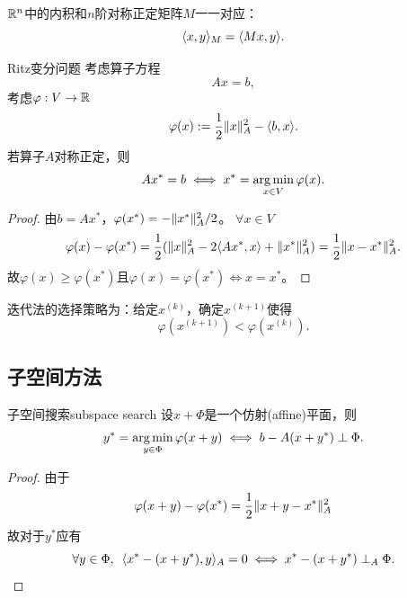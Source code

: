 \begin{corollary}
    $\mathbb{R}^n$中的内积和$n$阶对称正定矩阵$M$一一对应：
    \begin{equation}\label{eq:na-spd-inner-product}
        \langle x,y\rangle_M = \langle Mx,y\rangle.
    \end{equation}
\end{corollary}

\begin{theorem}
    {Ritz变分问题}{}
    考虑算子方程
    \[
        Ax = b,
    \]
    考虑$\varphi:V \to \mathbb{R}$
    \begin{equation}
        \varphi(x) := \frac12\lVert x\rVert_A^2 - \langle b,x\rangle.
    \end{equation}
    若算子$A$对称正定，则
    \begin{equation}
        Ax^* = b \iff x^* = \operatorname*{arg\,min}_{x\in V}\varphi(x).
    \end{equation}
\end{theorem}

\begin{proof}
    由$b = Ax^*$，$\varphi(x^*) = -\lVert x^*\rVert_A^2/2$。
    $\forall x \in V$
    \[
        \varphi(x) - \varphi(x^*) = \frac12(\lVert x\rVert_A^2 - 2\langle Ax^*,x\rangle + \lVert x^*\rVert_A^2) = \frac12\lVert x - x^*\rVert^2_A.
    \]
    故$\varphi(x) \geq \varphi(x^*)$且$\varphi(x) = \varphi(x^*) \iff x = x^*$。
\end{proof}

\begin{corollary}
    迭代法的选择策略为：给定$x^{(k)}$，确定$x^{(k+1)}$使得
    \[
        \varphi(x^{(k+1)}) < \varphi(x^{(k)}).
    \]
\end{corollary}

\subsection{子空间方法}
\label{ssec:subspace method}

\begin{theorem}
    {子空间搜索}{subspace search}
    设$x + \Phi$是一个仿射(affine)平面，则
    \begin{equation}\label{eq:na-subspace-minimization}
        y^* = \operatorname*{arg\,min}_{y\in\Phi}\varphi(x + y) \iff
        b - A(x + y^*) \perp \Phi.
    \end{equation}
\end{theorem}

\begin{proof}
    由于
    \[
        \varphi(x + y) - \varphi(x^*) = \frac12\lVert x + y - x^*\rVert_A^2
    \]
    故对于$y^*$应有
    \[
        \forall y \in \Phi,\enspace\langle x^* - (x + y^*),y\rangle_A = 0 \iff
        x^* - (x + y^*) \perp_A\Phi.
        \qedhere
    \]
\end{proof}

